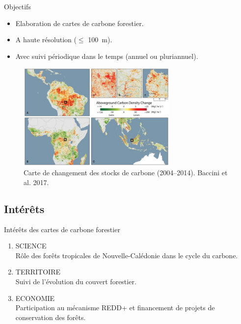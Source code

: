 \documentclass[10pt,table,dvipsnames,compress]{beamer}
\begin{document}
\begin{frame}[label={sec:org4adc310}]{Objectifs}
\begin{itemize}
\item Elaboration de cartes de carbone forestier.
\item A haute résolution (\(\leq\) 100 m).
\item Avec suivi périodique dans le temps (annuel ou pluriannuel).
\end{itemize}

\begin{figure}[htbp]
\centering
\includegraphics[width=0.7\textwidth]{figs/Baccini2017_Cchange.jpg}
\caption{Carte de changement des stocks de carbone (2004--2014). Baccini et al. 2017.}
\end{figure}
\end{frame}

\subsection{Intérêts}
\label{sec:orgf5f5751}

\begin{frame}[label={sec:orga299f4d}]{Intérêts des cartes de carbone forestier}
\begin{enumerate}
\item \alert{SCIENCE} \\
Rôle des forêts tropicales de Nouvelle-Calédonie dans le cycle du carbone.
\item \alert{TERRITOIRE} \\
Suivi de l'évolution du couvert forestier.
\item \alert{ECONOMIE} \\
Participation au mécanisme REDD+ et financement de projets de conservation des forêts.
\end{enumerate}
\end{frame}
\end{document}
